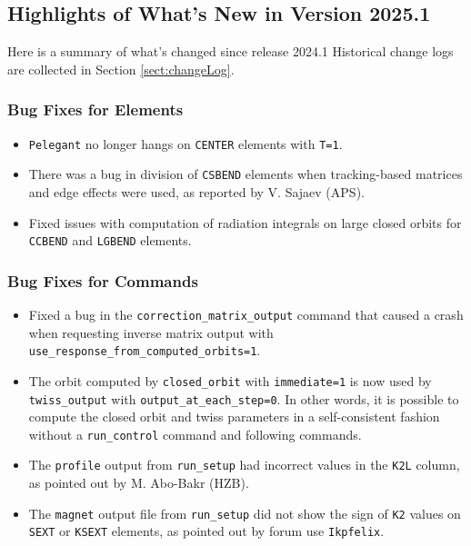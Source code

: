 \documentclass[11pt]{article}
\begin{document}
\subsection{Highlights of What's New in Version 2025.1}

Here is a summary of what's changed since release 2024.1  Historical change logs are collected in Section
\ref{sect:changeLog}.

\subsubsection{Bug Fixes for Elements}

\begin{itemize}
\item \verb|Pelegant| no longer hangs on \verb|CENTER| elements with \verb|T=1|.
\item There was a bug in division of \verb|CSBEND| elements when tracking-based matrices and edge effects were used,
  as reported by V. Sajaev (APS).
\item Fixed issues with computation of radiation integrals on large closed orbits for \verb|CCBEND| and \verb|LGBEND|
  elements.
\end{itemize}

\subsubsection{Bug Fixes for Commands}
\begin{itemize}
\item Fixed a bug in the \verb|correction_matrix_output| command that caused a crash when requesting inverse matrix
  output with \verb|use_response_from_computed_orbits=1|.
\item The orbit computed by \verb|closed_orbit| with \verb|immediate=1| is now used by \verb|twiss_output| with
  \verb|output_at_each_step=0|. In other words, it is possible to compute the closed orbit and twiss parameters
  in a self-consistent fashion without a \verb|run_control| command and following commands.
\item The \verb|profile| output from \verb|run_setup| had incorrect values in the \verb|K2L| column, as pointed
  out by M. Abo-Bakr (HZB).
\item The \verb|magnet| output file from  \verb|run_setup| did not show the sign of \verb|K2| values on 
  \verb|SEXT| or \verb|KSEXT| elements, as pointed out by forum use \verb|Ikpfelix|.
\end{itemize}
\end{document}
